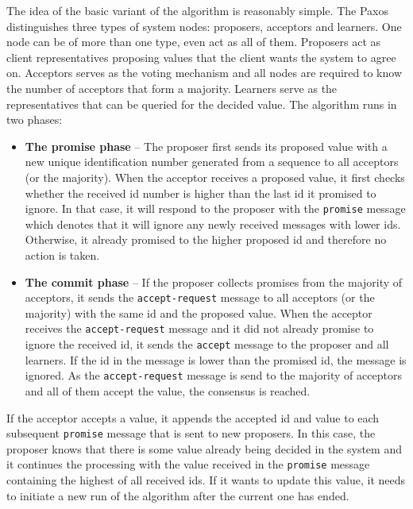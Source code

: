 \documentclass[oneside,
  digital, %
  table,   %
  lof,     %
  lot,     %
]{fithesis3}
\begin{document}
The idea of the basic variant of the algorithm is reasonably simple. The Paxos distinguishes three types of system nodes: proposers, acceptors and learners. One node can be of more than one type, even act as all of them. Proposers act as client representatives proposing values that the client wants the system to agree on. Acceptors serves as the voting mechanism and all nodes are required to know the number of acceptors that form a majority. Learners serve as the representatives that can be queried for the decided value. The algorithm runs in two phases:

\begin{itemize}
    \item \textbf{The promise phase} -- The proposer first sends its proposed value with a new unique identification number generated from a sequence to all acceptors (or the majority). When the acceptor receives a proposed value, it first checks whether the received id number is higher than the last id it promised to ignore. In that case, it will respond to the proposer with the \texttt{promise} message which denotes that it will ignore any newly received messages with lower ids. Otherwise, it already promised to the higher proposed id and therefore no action is taken.
    
    \item \textbf{The commit phase} -- If the proposer collects promises from the majority of acceptors, it sends the \texttt{accept-request} message to all acceptors (or the majority) with the same id and the proposed value. When the acceptor receives the \texttt{accept-request} message and it did not already promise to ignore the received id, it sends the \texttt{accept} message to the proposer and all learners. If the id in the message is lower than the promised id, the message is ignored. As the \texttt{accept-request} message is send to the majority of acceptors and all of them accept the value, the consensus is reached.
\end{itemize}

If the acceptor accepts a value, it appends the accepted id and value to each subsequent \texttt{promise} message that is sent to new proposers. In this case, the proposer knows that there is some value already being decided in the system and it continues the processing with the value received in the \texttt{promise} message containing the highest of all received ids. If it wants to update this value, it needs to initiate a new run of the algorithm after the current one has ended. 
\end{document}
